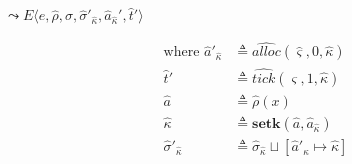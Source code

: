 \documentclass[12pt,draft]{article}
\begin{document}
{\begin{multicols*}{2}
\begin{center}
  $\leadsto E\langle e , \hat{\rho} , \hat{\sigma} , \hat{\sigma}'_{\hat{\kappa}} , \hat{a}_{\hat{\kappa}}' , \hat{t}'\rangle$
\end{center}
\vspace{-4mm}
\begin{align*}
  \text{where } \hat{a}'_{\hat{\kappa}} &\triangleq \widehat{alloc}(\hat{\varsigma}, 0, \hat{\kappa}) \\
  \hat{t}' &\triangleq \widehat{tick}(\hat{\varsigma}, 1, \hat{\kappa}) \\
  \hat{a} &\triangleq \hat{\rho}(x) \\
  \hat{\kappa} &\triangleq \textbf{setk}(\hat{a}, \hat{a}_{\hat\kappa}) \\
  \hat{\sigma}'_{\hat{\kappa}} &\triangleq \hat{\sigma}_{\hat{\kappa}} \sqcup [\hat{a}'_{\hat{\kappa}} \mapsto \hat{\kappa}]
\end{align*}


\vfill\null
\columnbreak


\end{multicols*}}
\end{document}

